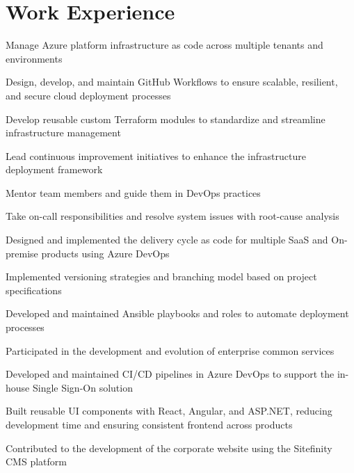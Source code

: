 \documentclass[]{deedy-resume-openfont}
\begin{document}
\section{Work Experience}
\hfill {}
\begin{tightemize}
	\item Manage Azure platform infrastructure as code across multiple tenants and environments
	\item Design, develop, and maintain GitHub Workflows to ensure scalable, resilient, and secure cloud deployment processes
	\item Develop reusable custom Terraform modules to standardize and streamline infrastructure management
	\item Lead continuous improvement initiatives to enhance the infrastructure deployment framework
	\item Mentor team members and guide them in DevOps practices
	\item Take on-call responsibilities and resolve system issues with root-cause analysis
\end{tightemize}
\sectionsep
{}
\sectionsep
{}\hfill {}
\begin{tightemize}
	\item Designed and implemented the delivery cycle as code for multiple SaaS and On-premise products using Azure DevOps
	\item Implemented versioning strategies and branching model based on project specifications
	\item Developed and maintained Ansible playbooks and roles to automate deployment processes
\end{tightemize}
\sectionsep
{}
\sectionsep
{}\hfill {}
\begin{tightemize}
	\item Participated in the development and evolution of enterprise common services
	\item Developed and maintained CI/CD pipelines in Azure DevOps to support the in-house Single Sign-On solution
	\item Built reusable UI components with React, Angular, and ASP.NET, reducing development time and ensuring consistent frontend across products
	\item Contributed to the development of the corporate website using the Sitefinity CMS platform
\end{tightemize}
\end{document}
